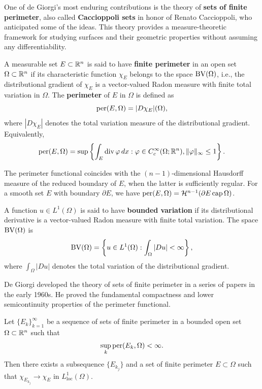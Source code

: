 One of de Giorgi's most enduring contributions is the theory of \textbf{sets of finite perimeter}, also called \textbf{Caccioppoli sets} in honor of Renato Caccioppoli, who anticipated some of the ideas. This theory provides a measure-theoretic framework for studying surfaces and their geometric properties without assuming any differentiability.

\begin{definition}
A measurable set \(E \subset \mathbb{R}^n\) is said to have \textbf{finite perimeter} in an open set \(\Omega \subset \mathbb{R}^n\) if its characteristic function \(\chi_E\) belongs to the space \(\operatorname{BV}(\Omega)\), i.e., the distributional gradient of \(\chi_E\) is a vector-valued Radon measure with finite total variation in \(\Omega\). The \textbf{perimeter} of \(E\) in \(\Omega\) is defined as
\[
\operatorname{per}(E,\Omega) = |D\chi_E|(\Omega),
\]
where \(|D\chi_E|\) denotes the total variation measure of the distributional gradient. Equivalently,
\[
\operatorname{per}(E,\Omega) = \sup \left\{ \int_E \operatorname{div} \varphi \, dx : \varphi \in C^\infty_c(\Omega; \mathbb{R}^n), \|\varphi\|_\infty \leq 1 \right\}.
\]
\end{definition}

The perimeter functional coincides with the \((n-1)\)-dimensional Hausdorff measure of the reduced boundary of \(E\), when the latter is sufficiently regular. For a smooth set \(E\) with boundary \(\partial E\), we have \(\operatorname{per}(E,\Omega) = \mathcal{H}^{n-1}(\partial E \operatorname{\mathrm{cap}} \Omega)\).

\begin{definition}
A function \(u \in L^1(\Omega)\) is said to have \textbf{bounded variation} if its distributional derivative is a vector-valued Radon measure with finite total variation. The space \(\operatorname{BV}(\Omega)\) is
\[
\operatorname{BV}(\Omega) = \left\{ u \in L^1(\Omega) : \int_\Omega |Du| < \infty \right\},
\]
where \(\int_\Omega |Du|\) denotes the total variation of the distributional gradient.
\end{definition}

De Giorgi developed the theory of sets of finite perimeter in a series of papers in the early 1960s. He proved the fundamental compactness and lower semicontinuity properties of the perimeter functional.

\begin{theorem}
Let \(\{E_k\}_{k=1}^\infty\) be a sequence of sets of finite perimeter in a bounded open set \(\Omega \subset \mathbb{R}^n\) such that
\[
\sup_k \operatorname{per}(E_k,\Omega) < \infty.
\]
Then there exists a subsequence \(\{E_{k_j}\}\) and a set of finite perimeter \(E \subset \Omega\) such that \(\chi_{E_{k_j}} \to \chi_E\) in \(L^1_{\mathrm{loc}}(\Omega)\).
\end{theorem}

